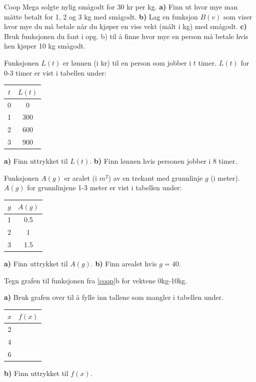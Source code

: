




	
\opgt
{}
Coop Mega solgte nylig smågodt for 30 kr per kg.\os
\textbf{a)} Finn ut hvor mye man måtte betalt for 1, 2 og 3 kg med smågodt.\os
\textbf{b)} Lag en funksjon $ B(v) $ som viser hvor mye du må betale når du kjøper en viss vekt (målt i kg) med smågodt.\os
\textbf{c)} Bruk funksjonen du fant i opg. b) til å finne hvor mye en person må betale hvis hen kjøper 10 kg smågodt.

Funksjonen $ L(t) $ er lønnen (i kr) til en person som jobber i $ t $ timer. $ L(t) $ for 0-3 timer er vist i tabellen under:
\begin{center}
	\begin{tabular}{|c|c|}
		\hline
		\boldmath $ t$ &\boldmath $ L(t) $\\ \hline 
		0 & 0\\ \hline 
		1 & 300\\ \hline 
		2 & 600 \\\hline 
		3 & 900 \\\hline 
	\end{tabular}
\end{center}
\textbf{a)} Finn uttrykket til $ L(t) $.\os
\textbf{b)} Finn lønnen hvis personen jobber i 8 timer.

Funksjonen $ A(g) $ er aralet (i $ m^2 $) av en trekant med grunnlinje $ g $ (i meter). $ A(g) $ for grunnlinjene 1-3 meter er vist i tabellen under:
\begin{center}
	\begin{tabular}{|c|c|}
		\hline
		\boldmath $g$ &\boldmath $ A(g) $\\ \hline 
		1 & 0.5\\ \hline 
		2 & 1 \\\hline 
		3 & 1.5 \\\hline 
	\end{tabular}
\end{center}
\textbf{a)} Finn uttrykket til $ A(g) $.\os
\textbf{b)} Finn arealet hvis $ {g=40} $.\os

\nes
{}
Tegn grafen til funksjonen fra \ref{coop}b for vektene 0kg-10kg. 

\textbf{a)} Bruk grafen over til å fylle inn tallene som mangler i tabellen under.
\begin{center}
	\begin{tabular}{|c|c|}
		\hline
		\boldmath $ x$ &\boldmath $ f(x) $\\ \hline 
		2 & \\ \hline 
		4 &  \\\hline 
		6 &  \\\hline 
	\end{tabular}
\end{center}
\textbf{b)} Finn uttrykket til $ f(x) $.

